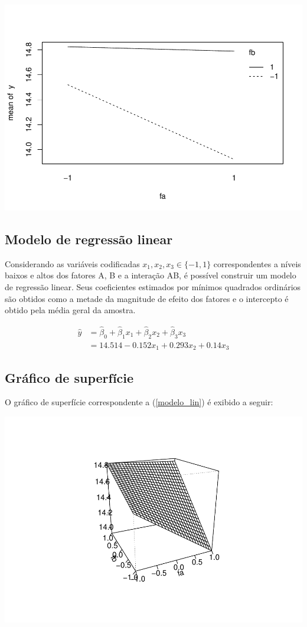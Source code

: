 \documentclass[
]{article}
\begin{document}
\begin{center}\includegraphics[width=0.6\linewidth]{lista9_files/figure-latex/graf-interacao2-1} \end{center}

\hypertarget{modelo-de-regressuxe3o-linear}{%
\subsection{Modelo de regressão
linear}\label{modelo-de-regressuxe3o-linear}}

Considerando as variáveis codificadas \(x_1, x_2, x_3 \in \{-1, 1\}\)
correspondentes a níveis baixos e altos dos fatores A, B e a interação
AB, é possível construir um modelo de regressão linear. Seus
coeficientes estimados por mínimos quadrados ordinários são obtidos como
a metade da magnitude de efeito dos fatores e o intercepto é obtido pela
média geral da amostra.

\begin{align}
  \hat{y} &= \hat{\beta}_0 + \hat{\beta}_1 x_1 + \hat{\beta}_2 x_2 + \hat{\beta}_3 x_3 \nonumber \\
   &= 14.514 - 0.152 x_1 + 0.293 x_2 +  0.14 x_3 \label{modelo_lin}
\end{align}

\hypertarget{gruxe1fico-de-superfuxedcie}{%
\subsection{Gráfico de superfície}\label{gruxe1fico-de-superfuxedcie}}

O gráfico de superfície correspondente a (\ref{modelo_lin}) é exibido a
seguir:

\begin{center}\includegraphics[width=0.75\linewidth]{lista9_files/figure-latex/superficie-1} \end{center}
\end{document}
